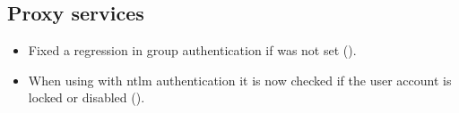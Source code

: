 






\subsection{Proxy services}
\begin{itemize}
\item Fixed a regression in  group authentication if 
was not set ().
\item When using  with ntlm authentication it is now checked if the user account
is locked or disabled ().
\end{itemize}

